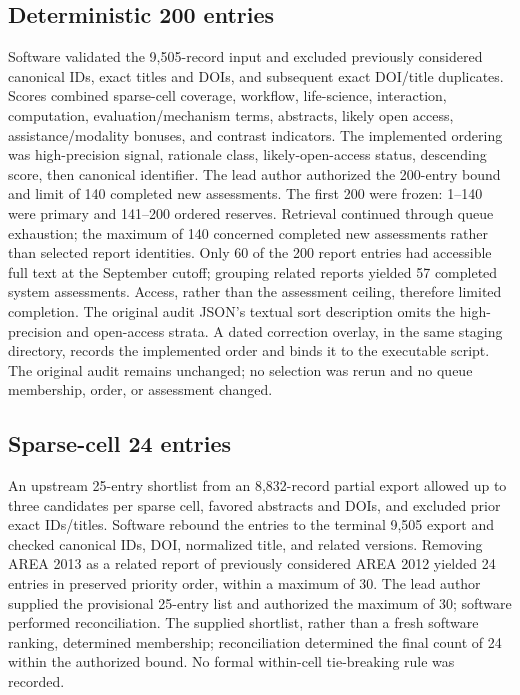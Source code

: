 \documentclass[11pt]{article}
\begin{document}
\subsection{Deterministic 200 entries}
Software validated the 9,505-record input and excluded previously considered canonical IDs, exact titles and DOIs, and subsequent exact DOI/title duplicates. Scores combined sparse-cell coverage, workflow, life-science, interaction, computation, evaluation/mechanism terms, abstracts, likely open access, assistance/modality bonuses, and contrast indicators. The implemented ordering was high-precision signal, rationale class, likely-open-access status, descending score, then canonical identifier. The lead author authorized the 200-entry bound and limit of 140 completed new assessments. The first 200 were frozen: 1--140 were primary and 141--200 ordered reserves. Retrieval continued through queue exhaustion; the maximum of 140 concerned completed new assessments rather than selected report identities. Only 60 of the 200 report entries had accessible full text at the September cutoff; grouping related reports yielded 57 completed system assessments. Access, rather than the assessment ceiling, therefore limited completion. The original audit JSON's textual sort description omits the high-precision and open-access strata. A dated correction overlay,  in the same staging directory, records the implemented order and binds it to the executable script. The original audit remains unchanged; no selection was rerun and no queue membership, order, or assessment changed.

\subsection{Sparse-cell 24 entries}
An upstream 25-entry shortlist from an 8,832-record partial export allowed up to three candidates per sparse cell, favored abstracts and DOIs, and excluded prior exact IDs/titles. Software rebound the entries to the terminal 9,505 export and checked canonical IDs, DOI, normalized title, and related versions. Removing AREA 2013 as a related report of previously considered AREA 2012 yielded 24 entries in preserved priority order, within a maximum of 30. The lead author supplied the provisional 25-entry list and authorized the maximum of 30; software performed reconciliation. The supplied shortlist, rather than a fresh software ranking, determined membership; reconciliation determined the final count of 24 within the authorized bound. No formal within-cell tie-breaking rule was recorded.
\end{document}
